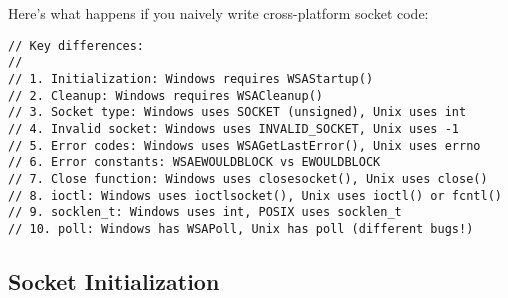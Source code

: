 Here's what happens if you naively write cross-platform socket code:

\begin{lstlisting}
// Key differences:
//
// 1. Initialization: Windows requires WSAStartup()
// 2. Cleanup: Windows requires WSACleanup()
// 3. Socket type: Windows uses SOCKET (unsigned), Unix uses int
// 4. Invalid socket: Windows uses INVALID_SOCKET, Unix uses -1
// 5. Error codes: Windows uses WSAGetLastError(), Unix uses errno
// 6. Error constants: WSAEWOULDBLOCK vs EWOULDBLOCK
// 7. Close function: Windows uses closesocket(), Unix uses close()
// 8. ioctl: Windows uses ioctlsocket(), Unix uses ioctl() or fcntl()
// 9. socklen_t: Windows uses int, POSIX uses socklen_t
// 10. poll: Windows has WSAPoll, Unix has poll (different bugs!)
\end{lstlisting}

\subsection{Socket Initialization}

